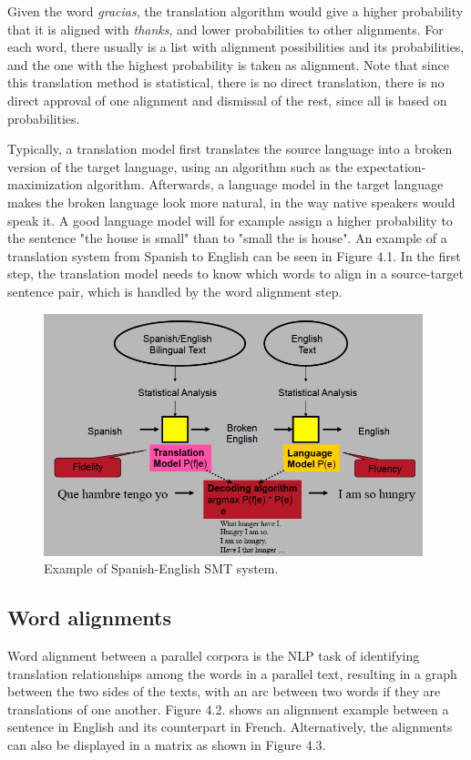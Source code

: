 Given the word \emph{gracias}, the translation algorithm would give a higher probability that it is aligned with \emph{thanks}, and lower probabilities to other alignments. For each word, there usually is a list with alignment possibilities and its probabilities, and the one with the highest probability is taken as alignment. Note that since this translation method is statistical, there is no direct translation, there is no direct approval of one alignment and dismissal of the rest, since all is based on probabilities.

Typically, a translation model first translates the source language into a broken version of the target language, using an algorithm such as the expectation-maximization algorithm. Afterwards, a language model in the target language makes the broken language look more natural, in the way native speakers would speak it. A good language model will for example assign a higher probability to the sentence "the house is small" than to "small the is house". An example of a translation system from Spanish to English can be seen in Figure  4.1. In the first step, the translation model needs to know which words to align in a source-target sentence pair, which is handled by the word alignment step.

\begin{figure}[!ht]
    \centering
    \includegraphics[width=11cm]{figures/smt.png}
    \caption{Example of Spanish-English SMT system.}
\end{figure}

\subsection{Word alignments}

Word alignment between a parallel corpora is the NLP task of identifying translation relationships among the words in a parallel text, resulting in a graph between the two sides of the texts, with an arc between two words if they are translations of one another. Figure 4.2. shows an alignment example between a sentence in English and its counterpart in French. Alternatively, the alignments can also be displayed in a matrix as shown in Figure 4.3.


